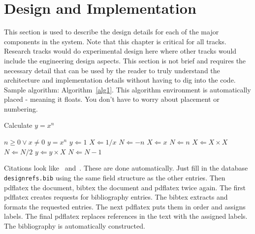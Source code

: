 
\chapter{Design  and Implementation}
This section is used to describe the design details for each of the major components 
in the system.    Note that this chapter is critical for all tracks.  Research tracks would do experimental design here where other tracks would include the engineering design aspects.    This section is not brief and requires the necessary detail that 
can be used by the reader to truly understand the architecture and implementation 
details without having to dig into the code.    Sample algorithm:  Algorithm~\ref{alg1}.  This algorithm environment is automatically placed - meaning it floats.   You don't have to worry about placement or numbering.  

\begin{algorithm} [tbh]                     %
\caption{Calculate $y = x^n$}          %
\label{alg1}                           %
\begin{algorithmic}                    %
    \REQUIRE $n \geq 0 \vee x \neq 0$
    \ENSURE $y = x^n$
    \STATE $y \Leftarrow 1$
        \STATE $X \Leftarrow 1 / x$
        \STATE $N \Leftarrow -n$
    \ELSE
        \STATE $X \Leftarrow x$
        \STATE $N \Leftarrow n$
    \ENDIF
            \STATE $X \Leftarrow X \times X$
            \STATE $N \Leftarrow N / 2$
        \ELSE[$N$ is odd]
            \STATE $y \Leftarrow y \times X$
            \STATE $N \Leftarrow N - 1$
        \ENDIF
    \ENDWHILE
\end{algorithmic}
\end{algorithm}
Citations look like~\cite{Choset:2005:PRM, arkin2009governing, lavalle2006}  and~\cite{wiki:asimo,lumelsky:1987, nolfi2000evolutionary}.  These are done automatically.  Just fill in the database {\tt designrefs.bib} using the same field structure as the other entries.  Then pdflatex the document, bibtex the document and pdflatex twice again.  The first pdflatex creates requests for bibliography entries.
The bibtex extracts and formats the requested entries.  The next pdflatex puts them in order and assigns labels.  The final pdflatex replaces references in the text with the assigned labels.
The bibliography is automatically constructed.  
 

